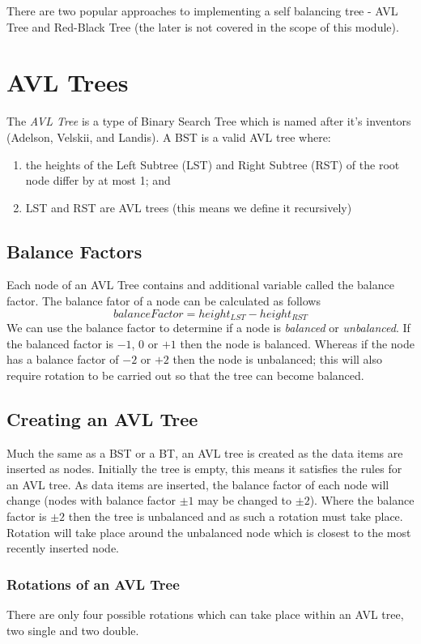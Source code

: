 There are two popular approaches to implementing a self balancing tree - AVL Tree and Red-Black Tree (the later is not covered in the scope of this module).

\section{AVL Trees}
The \textit{AVL Tree} is a type of Binary Search Tree which is named after it's inventors (Adelson, Velskii, and Landis). A BST is a valid AVL tree where:
\begin{enumerate}
    \item the heights of the Left Subtree (LST) and Right Subtree (RST) of the root node differ by at most 1; and
    \item LST and RST are AVL trees (this means we define it recursively)
\end{enumerate}

\subsection{Balance Factors}
Each node of an AVL Tree contains and additional variable called the balance factor. The balance fator of a node can be calculated as follows
\[balanceFactor = height_{LST} - height_{RST}\]
We can use the balance factor to determine if a node is \textit{balanced} or \textit{unbalanced}. If the balanced factor is $-1$, $0$ or $+1$ then the node is balanced. Whereas if the node has a balance factor of $-2$ or $+2$ then the node is unbalanced; this will also require rotation to be carried out so that the tree can become balanced.

\subsection{Creating an AVL Tree}
Much the same as a BST or a BT, an AVL tree is created as the data items are inserted as nodes. Initially the tree is empty, this means it satisfies the rules for an AVL tree. As data items are inserted, the balance factor of each node will change (nodes with balance factor $\pm 1$ may be changed to $\pm 2$). Where the balance factor is $\pm 2$ then the tree is unbalanced and as such a rotation must take place. Rotation will take place around the unbalanced node which is closest to the most recently inserted node.

\subsubsection{Rotations of an AVL Tree}
There are only four possible rotations which can take place within an AVL tree, two single and two double.\\

